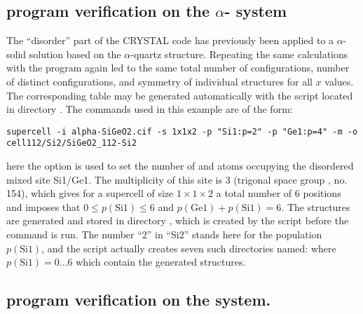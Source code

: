 \documentclass[a4paper,10pt]{article}
\begin{document}
\subsection*{\Sups{} program verification on the $\alpha$- system}

The ``disorder'' part of the CRYSTAL code has previously been applied to a $\alpha$- solid solution based on the $\alpha$-quartz structure\cite{El-Kelany2014}. Repeating the same calculations with the \sups{} program again led to the same total number of configurations, number of distinct configurations, and symmetry of individual structures for all $x$ values. The corresponding table may be generated automatically with the script  located in directory . The \sups{} commands used in this example are of the form:
\begin{Verbatim}[breaklines]
  supercell -i alpha-SiGeO2.cif -s 1x1x2 -p "Si1:p=2" -p "Ge1:p=4" -m -o cell112/Si2/SiGeO2_112-Si2
\end{Verbatim}
here the  option is used to set the number of  and  atoms occupying the disordered mixed site Si1/Ge1. The multiplicity of this site is 3 (trigonal space group , no. 154), which gives for a supercell of size $1\times1\times2$ a total number of 6 positions and imposes that $0 \leq p(\text{Si1})\leq 6$ and $p(\text{Ge1})+p(\text{Si1})=6$. The structures are generated and stored in directory , which is created by the script before the command is run. The number ``2'' in ``Si2'' stands here for the population $p(\text{Si1})$, and the script actually creates seven such directories named:  where $p(\text{Si1})=0...6$ which contain the generated structures.

\subsection*{\Sups{} program verification on the  system.}
\end{document}

